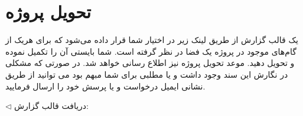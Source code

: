\documentclass[a4paper,12pt]{article}
\begin{document}
\section*{تحویل پروژه}
\label{sec:deliver-project}
یک قالب گزارش  از طریق لینک زیر
در اختیار شما قرار داده می‌شود که برای هریک از گام‌های موجود در پروژه یک فضا در نظر گرفته است. شما بایستی آن را تکمیل نموده و تحویل دهید.
موعد تحویل پروژه نیز اطلاع رسانی خواهد شد. در صورتی که مشکلی در نگارش این سند وجود داشت و یا مطلبی برای شما مبهم بود می توانید از طریق نشانی ایمیل 
درخواست و یا پرسش خود را ارسال فرمایید.

\noindent$\lhd$
دریافت قالب گزارش:

{\centerline{
}}



\clearpage
\thispagestyle{plain}
\fancyhead[LO,RE]{\slshape }
\onehalfspacing

\end{document}
